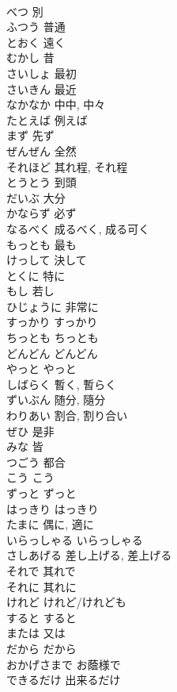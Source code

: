 \documentclass[8pt]{extreport}
\begin{document}
\begin{CJK}{UTF8}{min}
\\	べつ	別
\\	ふつう	普通
\\	とおく	遠く
\\	むかし	昔
\\	さいしょ	最初
\\	さいきん	最近
\\	なかなか	中中, 中々
\\	たとえば	例えば
\\	まず	先ず
\\	ぜんぜん	全然
\\	それほど	其れ程, それ程
\\	とうとう	到頭
\\	だいぶ	大分
\\	かならず	必ず
\\	なるべく	成るべく, 成る可く
\\	もっとも	最も
\\	けっして	決して
\\	とくに	特に
\\	もし	若し
\\	ひじょうに	非常に
\\	すっかり	すっかり
\\	ちっとも	ちっとも
\\	どんどん	どんどん
\\	やっと	やっと
\\	しばらく	暫く, 暫らく
\\	ずいぶん	随分, 隨分
\\	わりあい	割合, 割り合い
\\	ぜひ	是非
\\	みな	皆
\\	つごう	都合
\\	こう	こう
\\	ずっと	ずっと
\\	はっきり	はっきり
\\	たまに	偶に, 適に
\\	いらっしゃる	いらっしゃる
\\	さしあげる	差し上げる, 差上げる
\\	それで	其れで
\\	それに	其れに
\\	けれど	けれど/けれども
\\	すると	すると
\\	または	又は
\\	だから	だから
\\	おかげさまで	お蔭様で
\\	できるだけ	出来るだけ

\end{CJK}
\end{document}

